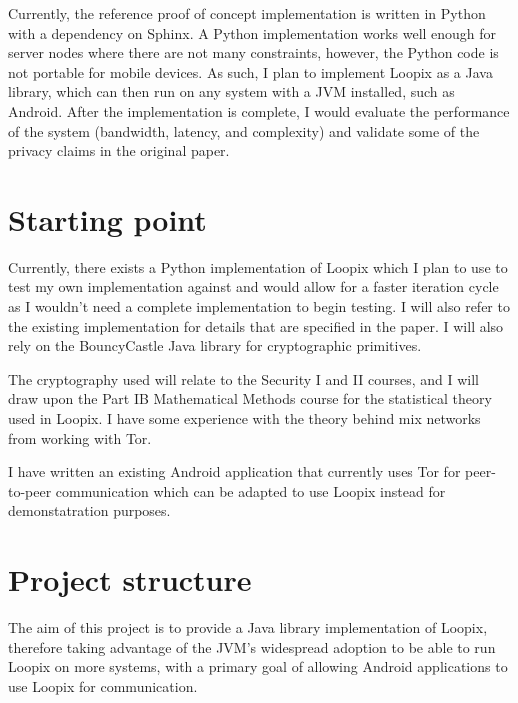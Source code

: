 \documentclass[12pt,a4paper,twoside]{article}
\begin{document}
	Currently, the reference proof of concept implementation is written in Python with a dependency on Sphinx\cite{danezis2009sphinx}. A Python implementation works well enough for server nodes where there are not many constraints, however, the Python code is not portable for mobile devices. As such, I plan to implement Loopix as a Java library, which can then run on any system with a JVM installed, such as Android. After the implementation is complete, I would evaluate the performance of the system (bandwidth, latency, and complexity) and validate some of the privacy claims in the original paper.
	
	
	\section*{Starting point}
	
	
	Currently, there exists a Python implementation of Loopix which I plan to use to test my own implementation against and would allow for a faster iteration cycle as I wouldn't need a complete implementation to begin testing. I will also refer to the existing implementation for details that are specified in the paper. I will also rely on the BouncyCastle Java library for cryptographic primitives.
	
	The cryptography used will relate to the Security I and II courses, and I will draw upon the Part IB Mathematical Methods course for the statistical theory used in Loopix. I have some experience with the theory behind mix networks from working with Tor.
	
	I have written an existing Android application that currently uses Tor for peer-to-peer communication which can be adapted to use Loopix instead for demonstatration purposes.
	
	\section*{Project structure}
	
	The aim of this project is to provide a Java library implementation of Loopix, therefore taking advantage of the JVM's widespread adoption to be able to run Loopix on more systems, with a primary goal of allowing Android applications to use Loopix for communication.
	
\end{document}
